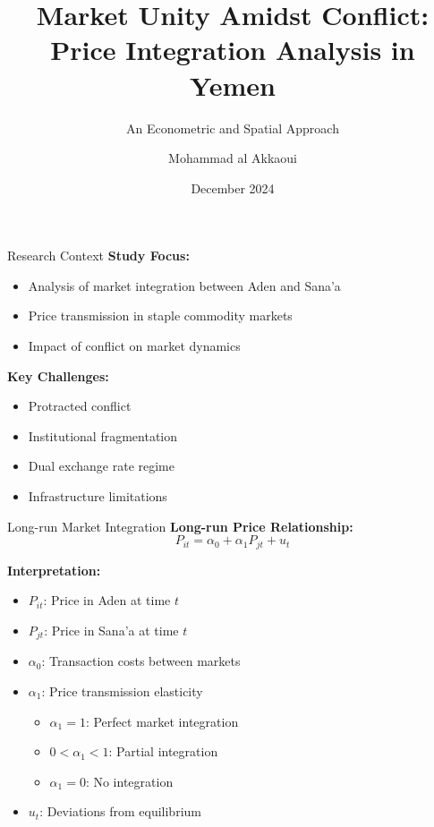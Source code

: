 \documentclass{beamer}
\title[Market Unity Amidst Conflict]{Market Unity Amidst Conflict:\\Price Integration Analysis in Yemen}
\subtitle{An Econometric and Spatial Approach}
\author{Mohammad al Akkaoui}
\date{December 2024}
\begin{document}
\begin{frame}
    \titlepage
\end{frame}

\begin{frame}{Research Context}
    \textbf{Study Focus:}
    \begin{itemize}
        \item Analysis of market integration between Aden and Sana'a
        \item Price transmission in staple commodity markets
        \item Impact of conflict on market dynamics
    \end{itemize}
    
    \textbf{Key Challenges:}
    \begin{itemize}
        \item Protracted conflict
        \item Institutional fragmentation
        \item Dual exchange rate regime
        \item Infrastructure limitations
    \end{itemize}
\end{frame}

\begin{frame}{Long-run Market Integration}
    \textbf{Long-run Price Relationship:}
    \begin{equation*}
    P_{it} = \alpha_0 + \alpha_1 P_{jt} + u_t
    \end{equation*}
    
    \textbf{Interpretation:}
    \begin{itemize}
        \item $P_{it}$: Price in Aden at time $t$
        \item $P_{jt}$: Price in Sana'a at time $t$
        \item $\alpha_0$: Transaction costs between markets
        \item $\alpha_1$: Price transmission elasticity
            \begin{itemize}
                \item $\alpha_1 = 1$: Perfect market integration
                \item $0 < \alpha_1 < 1$: Partial integration
                \item $\alpha_1 = 0$: No integration
            \end{itemize}
        \item $u_t$: Deviations from equilibrium
    \end{itemize}
\end{frame}
\end{document}
